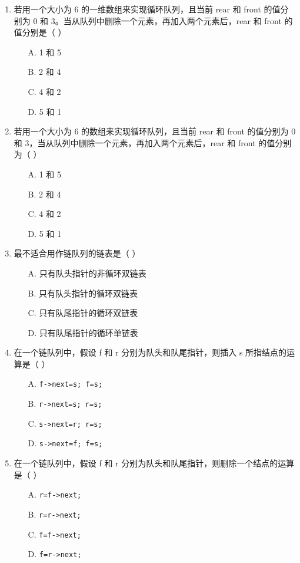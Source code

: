 \documentclass[12pt, a4paper]{article}
\begin{document}
\begin{enumerate}[label=\arabic*.]
	\item 若用一个大小为 6 的一维数组来实现循环队列，且当前 rear 和 front 的值分别为 0 和 3。当从队列中删除一个元素，再加入两个元素后，rear 和 front 的值分别是（ ）
	      \begin{enumerate}
		      \item[A.] 1 和 5
		      \item[B.] 2 和 4
		      \item[C.] 4 和 2
		      \item[D.] 5 和 1
	      \end{enumerate}

	\item 若用一个大小为 6 的数组来实现循环队列，且当前 rear 和 front 的值分别为 0 和 3，当从队列中删除一个元素，再加入两个元素后，rear 和 front 的值分别为（ ）
	      \begin{enumerate}
		      \item[A.] 1 和 5
		      \item[B.] 2 和 4
		      \item[C.] 4 和 2
		      \item[D.] 5 和 1
	      \end{enumerate}

	\item 最不适合用作链队列的链表是（ ）
	      \begin{enumerate}
		      \item[A.] 只有队头指针的非循环双链表
		      \item[B.] 只有队头指针的循环双链表
		      \item[C.] 只有队尾指针的循环双链表
		      \item[D.] 只有队尾指针的循环单链表
	      \end{enumerate}

	\item 在一个链队列中，假设 f 和 r 分别为队头和队尾指针，则插入 s 所指结点的运算是（ ）
	      \begin{enumerate}
		      \item[A.] \texttt{f->next=s; f=s;}
		      \item[B.] \texttt{r->next=s; r=s;}
		      \item[C.] \texttt{s->next=r; r=s;}
		      \item[D.] \texttt{s->next=f; f=s;}
	      \end{enumerate}

	\item 在一个链队列中，假设 f 和 r 分别为队头和队尾指针，则删除一个结点的运算是（ ）
	      \begin{enumerate}
		      \item[A.] \texttt{r=f->next;}
		      \item[B.] \texttt{r=r->next;}
		      \item[C.] \texttt{f=f->next;}
		      \item[D.] \texttt{f=r->next;}
	      \end{enumerate}


\end{enumerate}
\end{document}
